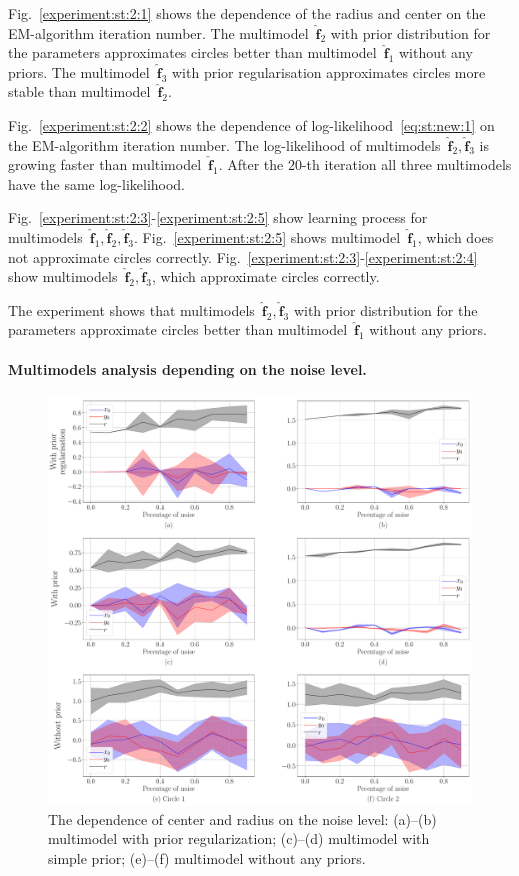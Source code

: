 \documentclass[12pt, twoside]{article}
\numberwithin{equation}{section}
\begin{document}
Fig.~\ref{experiment:st:2:1} shows the dependence of the radius and center on the EM-algorithm iteration number.
The multimodel~$\hat{\mathbf{f}}_2$ with prior distribution for the parameters approximates circles better than multimodel~$\hat{\mathbf{f}}_1$ without any priors.
The multimodel~$\hat{\mathbf{f}}_3$ with prior regularisation approximates circles more stable than multimodel~$\hat{\mathbf{f}}_2$.

Fig.~\ref{experiment:st:2:2} shows the dependence of log-likelihood~\eqref{eq:st:new:1} on the EM-algorithm iteration number.
The log-likelihood of multimodels~$\hat{\mathbf{f}}_2, \hat{\mathbf{f}}_3$ is growing faster than multimodel~$\hat{\mathbf{f}}_1$.  After the $20$-th iteration all three multimodels have the same log-likelihood.

Fig.~\ref{experiment:st:2:3}-\ref{experiment:st:2:5} show learning process for multimodels~$\hat{\mathbf{f}}_1, \hat{\mathbf{f}}_2, \hat{\mathbf{f}}_3$.
Fig.~\ref{experiment:st:2:5} shows multimodel~$\hat{\mathbf{f}}_1$, which does not approximate circles correctly.
Fig.~\ref{experiment:st:2:3}-\ref{experiment:st:2:4} show multimodels~$\hat{\mathbf{f}}_2, \hat{\mathbf{f}}_3$, which approximate circles correctly.

The experiment shows that multimodels~$\hat{\mathbf{f}}_2, \hat{\mathbf{f}}_3$ with prior distribution for the parameters approximate circles better than multimodel~$\hat{\mathbf{f}}_1$ without any priors.


\paragraph{Multimodels analysis depending on the noise level.} 
\begin{figure}[h!t]\center
\includegraphics[width=1\textwidth]{result_eng/experiment_synthetic_param_progress_noise}
\caption{The dependence of center and radius on the noise level: (a)--(b) multimodel with prior regularization; (c)--(d) multimodel with simple prior; (e)--(f) multimodel without any priors.}
\label{experiment:st:3:1}
\end{figure}
\end{document}
